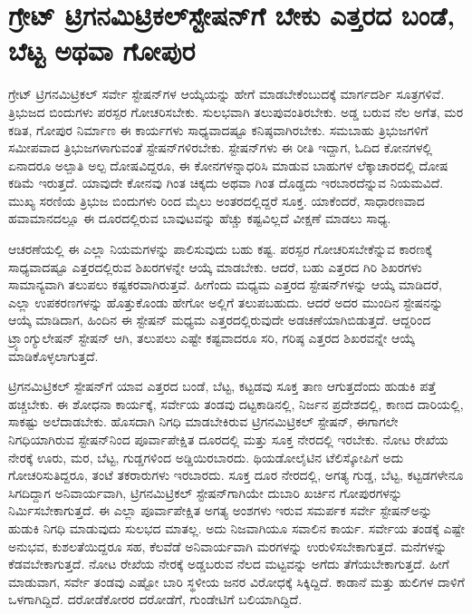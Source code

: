 
\chapter{ಗ್ರೇಟ್​ ಟ್ರಿಗನಮಿಟ್ರಿಕಲ್​ ಸ್ಟೇಷನ್​ಗೆ ಬೇಕು ಎತ್ತರದ ಬಂಡೆ, ಬೆಟ್ಟ ಅಥವಾ ಗೋಪುರ}

ಗ್ರೇಟ್​ ಟ್ರಿಗನಮಿಟ್ರಿಕಲ್​ ಸರ್ವೇ ಸ್ಟೇಷನ್​ಗಳ ಆಯ್ಕೆಯನ್ನು ಹೇಗೆ ಮಾಡಬೇಕೆಂಬುದಕ್ಕೆ ಮಾರ್ಗದರ್ಶಿ ಸೂತ್ರಗಳಿವೆ. ತ್ರಿಭುಜದ ಬಿಂದುಗಳು ಪರಸ್ಪರ ಗೋಚರಿಸಬೇಕು. ಸುಲಭವಾಗಿ ತಲುಪುವಂತಿರಬೇಕು. ಅಡ್ಡ ಬರುವ ನೆಲ ಅಗೆತ, ಮರ ಕಡಿತ, ಗೋಪುರ ನಿರ್ಮಾಣ ಈ ಕಾರ್ಯಗಳು ಸಾಧ್ಯವಾದಷ್ಟೂ ಕನಿಷ್ಠವಾಗಿರಬೇಕು. ಸಮಬಾಹು ತ್ರಿಭುಜಗಳಿಗೆ ಸಮೀಪವಾದ ತ್ರಿಭುಜಗಳಾಗುವಂತೆ ಸ್ಟೇಷನ್​ಗಳಿರಬೇಕು. ಸ್ಟೇಷನ್​ಗಳು ಈ ರೀತಿ ಇದ್ದಾಗ, ಓದಿದ ಕೋನಗಳಲ್ಲಿ ಏನಾದರೂ ಅಲ್ಪಾತಿ ಅಲ್ಪ ದೋಷವಿದ್ದರೂ, ಈ ಕೋನಗಳನ್ನಾಧರಿಸಿ ಮಾಡುವ ಬಾಹುಗಳ ಲೆಕ್ಕಾಚಾರದಲ್ಲಿ ದೋಷ ಕಡಿಮೆ ಇರುತ್ತದೆ. ಯಾವುದೇ ಕೋನವು  ಗಿಂತ ಚಿಕ್ಕದು ಅಥವಾ  ಗಿಂತ ದೊಡ್ಡದು ಇರಬಾರದೆನ್ನುವ ನಿಯಮವಿದೆ. ಮುಖ್ಯ ಸರಣಿಯ ತ್ರಿಭುಜ ಬಿಂದುಗಳು  ರಿಂದ  ಮೈಲು ಅಂತರದಲ್ಲಿದ್ದರೆ ಸೂಕ್ತ. ಯಾಕೆಂದರೆ, ಸಾಧಾರಣವಾದ ಹವಾಮಾನದಲ್ಲೂ ಈ ದೂರದಲ್ಲಿರುವ ಬಾವುಟವನ್ನು ಹೆಚ್ಚು ಕಷ್ಟವಿಲ್ಲದೆ ವೀಕ್ಷಣೆ ಮಾಡಲು ಸಾಧ್ಯ.

ಆಚರಣೆಯಲ್ಲಿ ಈ ಎಲ್ಲಾ ನಿಯಮಗಳನ್ನು ಪಾಲಿಸುವುದು ಬಹು ಕಷ್ಟ. ಪರಸ್ಪರ ಗೋಚರಿಸಬೇಕೆನ್ನುವ ಕಾರಣಕ್ಕೆ ಸಾಧ್ಯವಾದಷ್ಟೂ ಎತ್ತರದಲ್ಲಿರುವ ಶಿಖರಗಳನ್ನೇ ಆಯ್ಕೆ ಮಾಡಬೇಕು. ಆದರೆ, ಬಹು ಎತ್ತರದ ಗಿರಿ ಶಿಖರಗಳು ಸಾಮಾನ್ಯವಾಗಿ ತಲುಪಲು ಕಷ್ಟಕರವಾಗಿರುತ್ತವೆ. ಹೀಗೆಂದು ಮಧ್ಯಮ ಎತ್ತರದ ಸ್ಟೇಷನ್​ಗಳನ್ನು ಆಯ್ಕೆ ಮಾಡಿದರೆ, ಎಲ್ಲಾ ಉಪಕರಣಗಳನ್ನು ಹೊತ್ತುಕೊಂಡು ಹೇಗೋ ಅಲ್ಲಿಗೆ ತಲುಪಬಹುದು. ಆದರೆ ಅದರ ಮುಂದಿನ ಸ್ಟೇಷನನ್ನು ಆಯ್ಕೆ ಮಾಡಿದಾಗ, ಹಿಂದಿನ ಈ ಸ್ಟೇಷನ್​ ಮಧ್ಯಮ ಎತ್ತರದಲ್ಲಿರುವುದೇ ಅಡಚಣೆಯಾಗಿಬಿಡುತ್ತದೆ. ಆದ್ದರಿಂದ ಟ್ರ್ಯಾಂಗ್ಯುಲೇಷನ್​ ಸ್ಟೇಷನ್​ ಆಗಿ, ತಲುಪಲು ಎಷ್ಟೇ ಕಷ್ಟವಾದರೂ ಸರಿ, ಗರಿಷ್ಠ ಎತ್ತರದ ಶಿಖರವನ್ನೇ ಆಯ್ಕೆ ಮಾಡಿಕೊಳ್ಳಲಾಗುತ್ತದೆ.

ಟ್ರಿಗನಮಿಟ್ರಿಕಲ್​ ಸ್ಟೇಷನ್​ಗೆ ಯಾವ ಎತ್ತರದ ಬಂಡೆ, ಬೆಟ್ಟ, ಕಟ್ಟಡವು ಸೂಕ್ತ ತಾಣ ಆಗುತ್ತದೆಂದು ಹುಡುಕಿ ಪತ್ತೆ ಹಚ್ಚಬೇಕು. ಈ ಶೋಧನಾ ಕಾರ್ಯಕ್ಕೆ, ಸರ್ವೇಯ ತಂಡವು ದಟ್ಟಕಾಡಿನಲ್ಲಿ, ನಿರ್ಜನ ಪ್ರದೇಶದಲ್ಲಿ, ಕಾಣದ ದಾರಿಯಲ್ಲಿ, ಸಾಕಷ್ಟು ಅಲೆದಾಡಬೇಕು. ಹೊಸದಾಗಿ ನಿಗಧಿ ಮಾಡಬೇಕಿರುವ ಟ್ರಿಗನಮಿಟ್ರಿಕಲ್​ ಸ್ಟೇಷನ್​, ಈಗಾಗಲೇ ನಿಗಧಿಯಾಗಿರುವ ಸ್ಟೇಷನ್​ನಿಂದ ಪೂರ್ವಾಪೇಕ್ಷಿತ ದೂರದಲ್ಲಿ ಮತ್ತು ಸೂಕ್ತ ನೇರದಲ್ಲಿ ಇರಬೇಕು. ನೋಟ ರೇಖೆಯ ನೇರಕ್ಕೆ ಊರು, ಮರ, ಬೆಟ್ಟ, ಗುಡ್ಡಗಳಿಂದ ಅಡ್ಡಿಯಿರಬಾರದು. ಥಿಯಡೋಲೈಟಿನ ಟೆಲಿಸ್ಕೋಪಿಗೆ ಅದು ಗೋಚರಿಸುತಿದ್ದರೂ, ತಂಟೆ ತಕರಾರುಗಳು ಇರಬಾರದು. ಸೂಕ್ತ ದೂರ ನೇರದಲ್ಲಿ, ಅಗತ್ಯ ಗುಡ್ಡ, ಬೆಟ್ಟ, ಕಟ್ಟಡಗಳೇನೂ ಸಿಗದಿದ್ದಾಗ ಅನಿವಾರ್ಯವಾಗಿ, ಟ್ರಿಗನಮಿಟ್ರಿಕಲ್​ ಸ್ಟೇಷನ್​ಗಾಗಿಯೇ ದುಬಾರಿ ಖರ್ಚಿನ ಗೋಪುರಗಳನ್ನು ನಿರ್ಮಿಸಬೇಕಾಗುತ್ತದೆ. ಈ ಎಲ್ಲಾ ಪೂರ್ವಾಪೇಕ್ಷಿತ ಅಗತ್ಯ ಅಂಶಗಳು ಇರುವ ಸಮರ್ಪಕ ಸರ್ವೇ ಸ್ಟೇಷನ್​ಅನ್ನು ಹುಡುಕಿ ನಿಗಧಿ ಮಾಡುವುದು ಸುಲಭದ ಮಾತಲ್ಲ. ಅದು ನಿಜವಾಗಿಯೂ ಸವಾಲಿನ ಕಾರ್ಯ. ಸರ್ವೇಯ ತಂಡಕ್ಕೆ ಎಷ್ಟೇ ಅನುಭವ, ಕುಶಲತೆಯಿದ್ದರೂ ಸಹ, ಕೆಲವೆಡೆ ಅನಿವಾರ್ಯವಾಗಿ ಮರಗಳನ್ನು ಉರುಳಿಸಬೇಕಾಗುತ್ತದೆ. ಮನೆಗಳನ್ನು ಕೆಡವಬೇಕಾಗುತ್ತದೆ. ನೋಟ ರೇಖೆಯ ನೇರಕ್ಕೆ ಅಡ್ಡಬರುವ ನೆಲದ ಮಟ್ಟವನ್ನು ಅಗೆದು ತೆಗೆಯಬೇಕಾಗುತ್ತದೆ. ಹೀಗೆ ಮಾಡುವಾಗ, ಸರ್ವೇ ತಂಡವು ಎಷ್ಟೋ ಬಾರಿ ಸ್ಥಳೀಯ ಜನರ ವಿರೋಧಕ್ಕೆ ಸಿಕ್ಕಿದ್ದಿದೆ. ಕಾಡಾನೆ ಮತ್ತು ಹುಲಿಗಳ ದಾಳಿಗೆ ಒಳಗಾಗಿದ್ದಿದೆ. ದರೋಡೆಕೋರರ ದರೋಡೆಗೆ, ಗುಂಡೇಟಿಗೆ ಬಲಿಯಾಗಿದ್ದಿದೆ.

